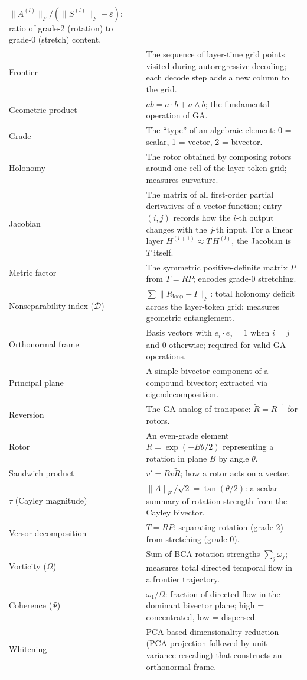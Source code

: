 \documentclass[11pt, twoside, openright]{memoir}
\newcommand{\ip}{\cdot}           %
\newcommand{\op}{\wedge}          %
\newcommand{\rev}[1]{\widetilde{#1}} %
\numberwithin{equation}{chapter}
\begin{document}
\begin{center}
\begin{tabular}{@{}L{4cm} L{7.5cm}@{}}
  $\|A^{(l)}\|_F / (\|S^{(l)}\|_F + \varepsilon)$: ratio of
  grade-2 (rotation) to grade-0 (stretch) content. \\
Frontier &
  The sequence of layer-time grid points visited during autoregressive
  decoding; each decode step adds a new column to the grid. \\
Geometric product &
  $ab = a \ip b + a \op b$; the fundamental operation of GA. \\
Grade &
  The ``type'' of an algebraic element: 0 = scalar, 1 = vector,
  2 = bivector. \\
Holonomy &
  The rotor obtained by composing rotors around one cell of the layer-token grid; measures
  curvature. \\
Jacobian &
  The matrix of all first-order partial derivatives of a vector
  function; entry $(i,j)$ records how the $i$-th output changes with
  the $j$-th input.  For a linear layer $H^{(l+1)} \approx T\,H^{(l)}$,
  the Jacobian is $T$ itself. \\
Metric factor &
  The symmetric positive-definite matrix $P$ from $T = RP$; encodes
  grade-0 stretching. \\
Nonseparability index ($\mathcal{D}$) &
  $\sum \|R_{\text{loop}} - I\|_F$: total holonomy deficit across the
  layer-token grid; measures geometric entanglement. \\
Orthonormal frame &
  Basis vectors with $e_i \ip e_j = 1$ when $i=j$ and $0$ otherwise; required for valid GA
  operations. \\
Principal plane &
  A simple-bivector component of a compound bivector; extracted via
  eigendecomposition. \\
Reversion &
  The GA analog of transpose: $\rev{R} = R^{-1}$ for rotors. \\
Rotor &
  An even-grade element $R = \exp(-B\theta/2)$ representing a rotation
  in plane $B$ by angle $\theta$. \\
Sandwich product &
  $v' = R v \rev{R}$; how a rotor acts on a vector. \\
$\tau$ (Cayley magnitude) &
  $\|A\|_F / \sqrt{2} = \tan(\theta/2)$: a scalar summary of rotation
  strength from the Cayley bivector. \\
Versor decomposition &
  $T = RP$: separating rotation (grade-2) from stretching (grade-0). \\
Vorticity ($\Omega$) &
  Sum of BCA rotation strengths $\sum_j \omega_j$; measures total
  directed temporal flow in a frontier trajectory. \\
Coherence ($\Psi$) &
  $\omega_1 / \Omega$: fraction of directed flow in the dominant
  bivector plane; high = concentrated, low = dispersed. \\
Whitening &
  PCA-based dimensionality reduction (PCA projection followed by unit-variance rescaling) that constructs an orthonormal frame. \\
\bottomrule
\end{tabular}
\end{center}
\end{document}

